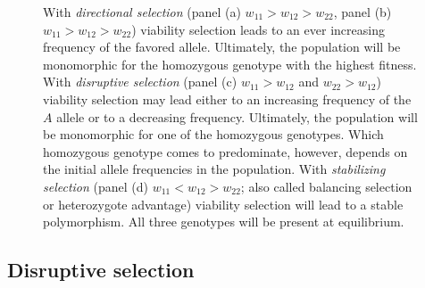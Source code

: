 \documentclass[12pt]{article}
\begin{document}
\begin{figure}
\begin{center}
\end{center}
\caption{With {\it directional selection\/} (panel (a) $w_{11} > w_{12} >
w_{22}$, panel (b) $w_{11} > w_{12} > w_{22}$) viability selection
leads to an ever increasing frequency of
the favored allele.  Ultimately, the population will be monomorphic
for the homozygous genotype with the highest
fitness. With {\it disruptive selection\/} (panel (c) $w_{11} >
w_{12}$ and $w_{22} > w_{12}$) viability selection may lead either to
an increasing   frequency of the $A$ allele or to a decreasing frequency.
  Ultimately, the population will be monomorphic for one of the
  homozygous genotypes.  Which homozygous genotype comes to
  predominate, however, depends on the initial allele frequencies in
  the population. With {\it stabilizing selection\/} (panel (d) $w_{11} < w_{12}
  > w_{22}$; also called balancing selection or heterozygote
  advantage) viability selection will lead to a stable polymorphism.
  All three genotypes will be present at equilibrium.}\label{fig:wbar}
\end{figure}

\subsection*{Disruptive selection}
\end{document}
